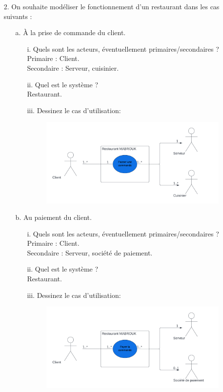 \documentclass[12pt]{article}
\begin{document}
\begin{itemize}
\begin{itemize}
\begin{itemize}
		\end{itemize}
		\end{itemize}
	\item[2. ] On souhaite modéliser le fonctionnement d’un restaurant dans les cas suivants :
	\begin{itemize}
		\item[a. ] À la prise de commande du client.
		\begin{itemize}
			\item[i. ] Quels sont les acteurs, éventuellement primaires/secondaires ?\\
			Primaire : Client.\\
			Secondaire : Serveur, cuisinier.
			\item[ii. ] Quel est le système ?\\
			Restaurant.
			\item[iii. ] Dessinez le cas d’utilisation:
				\begin{figure}[!hbtp]
				\includegraphics[scale=0.75]{capture3.PNG}
			\end{figure}
		\end{itemize}
	\item[b. ] Au paiement du client.
	\begin{itemize}
		\item[i. ] Quels sont les acteurs, éventuellement primaires/secondaires ?\\
		Primaire : Client.\\
		Secondaire : Serveur, société de paiement.
		\item[ii. ] Quel est le système ?\\
		Restaurant.
		\item[iii. ] Dessinez le cas d’utilisation:
			\begin{figure}[!hbtp]
			\includegraphics[scale=0.75]{capture4.PNG}

\end{figure}
\end{itemize}
\end{itemize}
\end{itemize}
\end{document}
